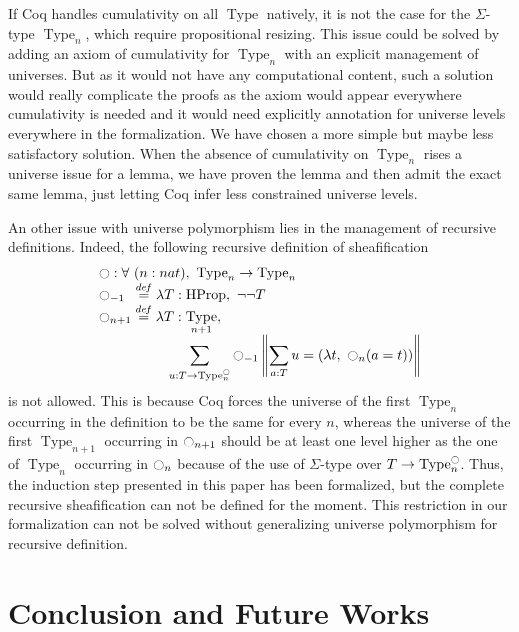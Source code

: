 \documentclass[conference]{IEEEtran}
\newcommand \defeq {\overset{de\hspace{-0.2ex}f}{=}}
\newcommand{\mynote}[2]{
    \fbox{\bfseries\sffamily\scriptsize#1}
    {\small$\blacktriangleright$\textsf{\emph{#2}}$\blacktriangleleft$}~}
\newcommand\nt[1]{\mynote{NT}{#1}}
\DeclareMathOperator{\Type}{Type}
\DeclareMathOperator{\HProp}{HProp}
\newcommand{\modal}{\ensuremath{\ocircle}}
\begin{document}
%
If Coq handles cumulativity on all $\Type$ natively, it is not
the case for the $\Sigma$-type $\Type_n$, which require propositional
resizing. 
%
This issue could be solved by adding an axiom of cumulativity
for $\Type_n$ with an explicit management of universes. 
%
But as it would not have any computational content, such a solution
would really complicate the proofs as the axiom would appear
everywhere cumulativity is needed and it would need explicitly
annotation for universe levels everywhere in the formalization.
%
We have chosen a more simple but maybe less satisfactory solution. 
%
When the absence of cumulativity on $\Type_n$ rises a universe issue
for a lemma, we have proven the lemma and then admit the exact same
lemma, just letting Coq infer less constrained universe levels.

An other issue with universe polymorphism lies in the management of
recursive definitions. Indeed, the following recursive definition of
sheafification
%
\[ \begin{array}{l}
   \modal : \forall \ (n : nat), \ \Type_n \to \Type_n 
   \\
    \modal_{-1\phantom{n}} \defeq \lambda T:\HProp,~ \lnot\lnot T \\
      \displaystyle{\modal_{n+1} \defeq  \lambda T:\Type_{n+1}},\\
      \hspace{5em} \displaystyle{\sum_{u:T \to \Type_n^\modal} \modal_{-1} 
      \left\|
      \sum_{a:T} u= (\lambda t,~\modal_n (a=t))
      \right\|}
    \end{array}
\]
%
is not allowed. 
%
This is because Coq forces the universe of the first $\Type_n$
occurring in the definition to be the same for every $n$, whereas the
universe of the first $\Type_{n+1}$ occurring in $\modal_{n+1}$ should be at
least one level higher as the one of $\Type_n$ occurring in
$\modal_{n}$ because of the use of $\Sigma$-type over
$T \to \Type_n^\modal$.
%
%
Thus, the induction step presented in this paper has been formalized,
but the complete recursive sheafification can not be defined for the
moment.
%
This restriction in our formalization can not be solved without
generalizing universe polymorphism for recursive definition.
%



\section{Conclusion and Future Works}
\label{sec:future-works}
\end{document}
